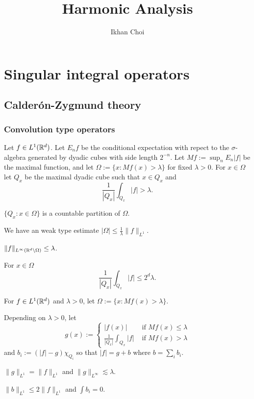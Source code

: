 \documentclass{../../large}
\begin{document}
\title{Harmonic Analysis}
\author{Ikhan Choi}
\maketitle
\tableofcontents


\part{Singular integral operators}
\chapter{Calder\'on-Zygmund theory}


\section{Convolution type operators}

\begin{prb}
\end{prb}

\begin{prb}
Let $f\in L^1(\mathbb{R}^d)$.
Let $E_nf$ be the conditional expectation with repect to the $\sigma$-algebra generated by dyadic cubes with side length $2^{-n}$.
Let $Mf:=\sup_nE_n|f|$ be the maximal function, and let $\Omega:=\{x:Mf(x)>\lambda\}$ for fixed $\lambda>0$.
For $x\in\Omega$ let $Q_x$ be the maximal dyadic cube such that $x\in Q_x$ and
\[\frac1{|Q_x|}\int_{Q_x}|f|>\lambda.\]
\begin{parts}
\item
$\{Q_x:x\in\Omega\}$ is a countable partition of $\Omega$.
\item
We have an weak type estimate $|\Omega|\le\frac1\lambda\|f\|_{L^1}$.
\item
$\|f\|_{L^\infty(\mathbb{R}^d\setminus\Omega)}\le\lambda$.
\item
For $x\in\Omega$
\[\frac1{|Q_x|}\int_{Q_x}|f|\le2^d\lambda.\]
\end{parts}
\end{prb}

\begin{prb}
For $f\in L^1(\mathbb{R}^d)$ and $\lambda>0$, let $\Omega:=\{x:Mf(x)>\lambda\}$.

Depending on $\lambda>0$, let
\[g(x):=\begin{cases}|f(x)|&\text{ if }Mf(x)\le\lambda\\\frac1{|Q_x|}\int_{Q_x}|f|&\text{ if }Mf(x)>\lambda\end{cases}\]
and $b_i:=(|f|-g)\chi_{Q_i}$ so that $|f|=g+b$ where $b=\sum_ib_i$.
\begin{parts}
\item $\|g\|_{L^1}=\|f\|_{L^1}$ and $\|g\|_{L^\infty}\lesssim\lambda$.
\item $\|b\|_{L^1}\le2\|f\|_{L^1}$ and $\int b_i=0$.
\end{parts}
\end{prb}
\begin{pf}

\end{pf}
\end{document}
